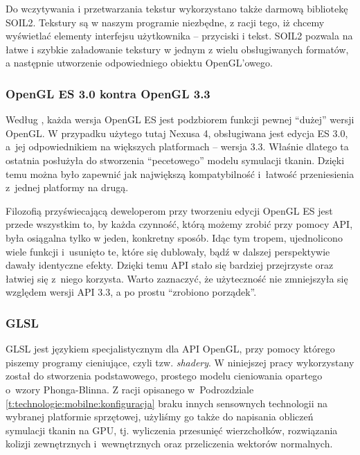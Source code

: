 		Do wczytywania i przetwarzania tekstur wykorzystano także darmową bibliotekę SOIL2. Tekstury są w naszym programie niezbędne, z racji tego, iż chcemy wyświetlać elementy interfejsu użytkownika -- przyciski i tekst. SOIL2 pozwala na łatwe i szybkie załadowanie tekstury w jednym z wielu obsługiwanych formatów, a następnie utworzenie odpowiedniego obiektu OpenGL'owego.
		
			\subsubsection{OpenGL ES 3.0 kontra OpenGL 3.3}
			\label{t:technologie:narzedzia:ogl:vs}
			
			Według \cite{oglspec}, każda wersja OpenGL ES jest podzbiorem funkcji pewnej ``dużej'' wersji OpenGL. W przypadku użytego tutaj Nexusa 4, obsługiwana jest edycja ES 3.0, a~jej odpowiednikiem na większych platformach -- wersja 3.3. Właśnie dlatego ta ostatnia posłużyła do stworzenia ``pecetowego'' modelu symulacji tkanin. Dzięki temu można było zapewnić jak największą kompatybilność i~łatwość przeniesienia z~jednej platformy na drugą.
			
			Filozofią przyświecającą deweloperom przy tworzeniu edycji OpenGL ES jest przede wszystkim to, by każda czynność, którą możemy zrobić przy pomocy API, była osiągalna tylko w jeden, konkretny sposób. Idąc tym tropem, ujednolicono wiele funkcji i~usunięto te, które się dublowały, bądź w dalszej perspektywie dawały identyczne efekty. Dzięki temu API stało się bardziej przejrzyste oraz łatwiej się z~niego korzysta. Warto zaznaczyć, że użyteczność nie zmniejszyła się względem wersji API 3.3, a po prostu ``zrobiono porządek''.
			
			\subsubsection{GLSL}
			\label{t:technologie:narzedzia:ogl:glsl}
			
			
			GLSL jest językiem specjalistycznym dla API OpenGL, przy pomocy którego piszemy programy cieniujące, czyli tzw. \emph{shadery}. W niniejszej pracy wykorzystany został do stworzenia podstawowego, prostego modelu cieniowania opartego o~wzory Phonga-Blinna. Z racji opisanego w~Podrozdziale \ref{t:technologie:mobilne:konfiguracja} braku innych sensownych technologii na wybranej platformie sprzętowej, użyliśmy go także do napisania obliczeń symulacji tkanin na GPU, tj. wyliczenia przesunięć wierzchołków, rozwiązania kolizji zewnętrznych i~wewnętrznych oraz przeliczenia wektorów normalnych.
			
